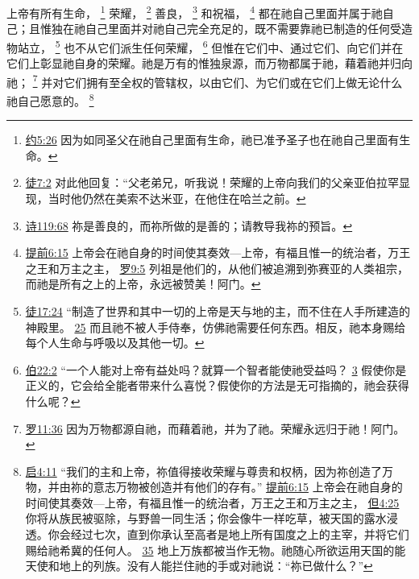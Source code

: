 \documentclass[12pt, a4paper, oneside]{ctexart}
\newcounter{parnum}[section]
\newcommand{\N}{%
   \noindent\refstepcounter{parnum}%
    \makebox[\parindent][l]{\textbf{\arabic{parnum}.}}}
\begin{document}
\N 上帝有所有生命，
	\footnote {
		\href{https://biblehub.com/john/5-26.htm}{约5:26} 因为如同圣父在祂自己里面有生命，祂已准予圣子也在祂自己里面有生命。
	}
	荣耀，
	\footnote {
		\href{https://biblehub.com/acts/7-2.htm}{徒7:2} 对此他回复：“父老弟兄，听我说！荣耀的上帝向我们的父亲亚伯拉罕显现，当时他仍然在美索不达米亚，在他住在哈兰之前。
	}
	善良，
	\footnote {
		\href{https://biblehub.com/psalms/119-68.htm}{诗119:68} 祢是善良的，而祢所做的是善的；请教导我祢的预旨。
	}
	和祝福，
	\footnote {
		\href{https://biblehub.com/1_timothy/6-15.htm}{提前6:15} 上帝会在祂自身的时间使其奏效---上帝，有福且惟一的统治者，万王之王和万主之主，
		\href{https://biblehub.com/romans/9-5.htm}{罗9:5} 列祖是他们的，从他们被追溯到弥赛亚的人类祖宗，而祂是所有之上的上帝，永远被赞美！阿门。
	}
	都在祂自己里面并属于祂自己；且惟独在祂自己里面并对祂自己完全充足的，既不需要靠祂已制造的任何受造物站立，
	\footnote {
		\href{https://biblehub.com/acts/17-24.htm}{徒17:24} “制造了世界和其中一切的上帝是天与地的主，而不住在人手所建造的神殿里。
		\href{https://biblehub.com/acts/17-25.htm}{25} 而且祂不被人手侍奉，仿佛祂需要任何东西。相反，祂本身赐给每个人生命与呼吸以及其他一切。
	}
	也不从它们派生任何荣耀，
	\footnote {
		\href{https://biblehub.com/job/22-2.htm}{伯22:2} “一个人能对上帝有益处吗？就算一个智者能使祂受益吗？
		\href{https://biblehub.com/job/22-3.htm}{3} 假使你是正义的，它会给全能者带来什么喜悦？假使你的方法是无可指摘的，祂会获得什么呢？
	}
	但惟在它们中、通过它们、向它们并在它们上彰显祂自身的荣耀。祂是万有的惟独泉源，而万物都属于祂，藉着祂并归向祂；
	\footnote {
		\href{https://biblehub.com/romans/11-36.htm}{罗11:36} 因为万物都源自祂，而藉着祂，并为了祂。荣耀永远归于祂！阿门。
	}
	并对它们拥有至全权的管辖权，以由它们、为它们或在它们上做无论什么祂自己愿意的。
	\footnote {
		\href{https://biblehub.com/revelation/4-11.htm}{启4:11} “我们的主和上帝，祢值得接收荣耀与尊贵和权柄，因为祢创造了万物，并由祢的意志万物被创造并有他们的存有。”
		\href{https://biblehub.com/1_timothy/6-15.htm}{提前6:15} 上帝会在祂自身的时间使其奏效---上帝，有福且惟一的统治者，万王之王和万主之主，
		\href{https://biblehub.com/daniel/4-25.htm}{但4:25} 你将从族民被驱除，与野兽一同生活；你会像牛一样吃草，被天国的露水浸透。你会经过七次，直到你承认至高者是地上所有国度之上的主宰，并将它们赐给祂希冀的任何人。
		\href{https://biblehub.com/daniel/4-35.htm}{35} 地上万族都被当作无物。祂随心所欲运用天国的能天使和地上的列族。没有人能拦住祂的手或对祂说：“祢已做什么？”
	}
\end{document}
